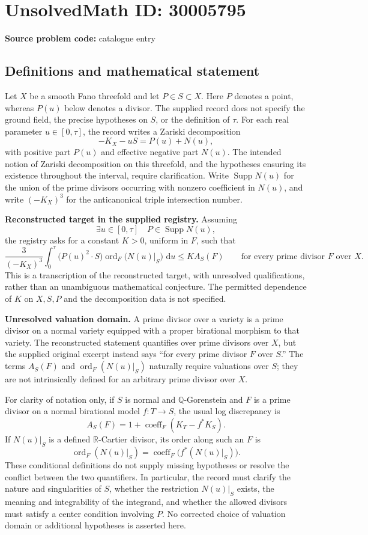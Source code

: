\documentclass[11pt]{article}
\newcommand{\dd}{\,\mathrm{d}}
\begin{document}
\section*{UnsolvedMath ID: 30005795}
\textbf{Source problem code:} catalogue entry
\subsection{Definitions and mathematical statement}
Let \(X\) be a smooth Fano threefold and let \(P\in S\subset X\). Here \(P\) denotes a point, whereas \(P(u)\) below denotes a divisor. The supplied record does not specify the ground field, the precise hypotheses on \(S\), or the definition of \(\tau\). For each real parameter \(u\in[0,\tau]\), the record writes a Zariski decomposition
\[
-K_X-uS=P(u)+N(u),
\]
with positive part \(P(u)\) and effective negative part \(N(u)\). The intended notion of Zariski decomposition on this threefold, and the hypotheses ensuring its existence throughout the interval, require clarification. Write \(\operatorname{Supp}N(u)\) for the union of the prime divisors occurring with nonzero coefficient in \(N(u)\), and write \((-K_X)^3\) for the anticanonical triple intersection number.

\textbf{Reconstructed target in the supplied registry.} Assuming
\[
\exists u\in[0,\tau]\quad P\in\operatorname{Supp}N(u),
\]
the registry asks for a constant \(K>0\), uniform in \(F\), such that
\[
\frac{3}{(-K_X)^3}
\int_0^\tau
\bigl(P(u)^2\cdot S\bigr)
\operatorname{ord}_F\!\bigl(N(u)|_S\bigr)\,\dd u
\leq K A_S(F)
\qquad
\text{for every prime divisor }F\text{ over }X.
\]
This is a transcription of the reconstructed target, with unresolved qualifications, rather than an unambiguous mathematical conjecture. The permitted dependence of \(K\) on \(X,S,P\) and the decomposition data is not specified.

\textbf{Unresolved valuation domain.} A prime divisor over a variety is a prime divisor on a normal variety equipped with a proper birational morphism to that variety. The reconstructed statement quantifies over prime divisors over \(X\), but the supplied original excerpt instead says ``for every prime divisor \(F\) over \(S\).'' The terms \(A_S(F)\) and \(\operatorname{ord}_F(N(u)|_S)\) naturally require valuations over \(S\); they are not intrinsically defined for an arbitrary prime divisor over \(X\).

For clarity of notation only, if \(S\) is normal and \(\mathbb Q\)-Gorenstein and \(F\) is a prime divisor on a normal birational model \(f:T\to S\), the usual log discrepancy is
\[
A_S(F)=1+\operatorname{coeff}_F(K_T-f^*K_S).
\]
If \(N(u)|_S\) is a defined \(\mathbb R\)-Cartier divisor, its order along such an \(F\) is
\[
\operatorname{ord}_F(N(u)|_S)
=\operatorname{coeff}_F\!\bigl(f^*(N(u)|_S)\bigr).
\]
These conditional definitions do not supply missing hypotheses or resolve the conflict between the two quantifiers. In particular, the record must clarify the nature and singularities of \(S\), whether the restriction \(N(u)|_S\) exists, the meaning and integrability of the integrand, and whether the allowed divisors must satisfy a center condition involving \(P\). No corrected choice of valuation domain or additional hypotheses is asserted here.
\end{document}
